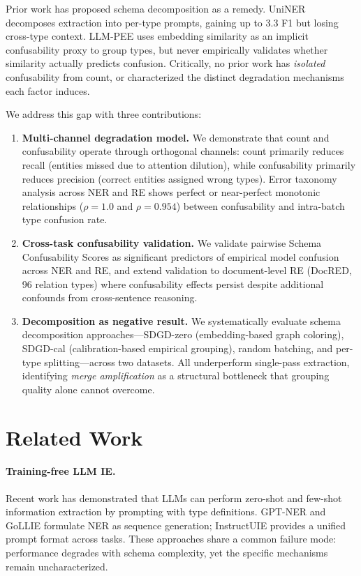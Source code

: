 \documentclass[11pt,a4paper]{article}
\begin{document}
Prior work has proposed schema decomposition as a remedy. UniNER decomposes extraction into per-type prompts, gaining up to 3.3 F1 but losing cross-type context. LLM-PEE uses embedding similarity as an implicit confusability proxy to group types, but never empirically validates whether similarity actually predicts confusion. Critically, no prior work has \emph{isolated} confusability from count, or characterized the distinct degradation mechanisms each factor induces.

We address this gap with three contributions:

\begin{enumerate}
\item \textbf{Multi-channel degradation model.} We demonstrate that count and confusability operate through orthogonal channels: count primarily reduces recall (entities missed due to attention dilution), while confusability primarily reduces precision (correct entities assigned wrong types). Error taxonomy analysis across NER and RE shows perfect or near-perfect monotonic relationships ($\rho{=}1.0$ and $\rho{=}0.954$) between confusability and intra-batch type confusion rate.

\item \textbf{Cross-task confusability validation.} We validate pairwise Schema Confusability Scores as significant predictors of empirical model confusion across NER and RE, and extend validation to document-level RE (DocRED, 96 relation types) where confusability effects persist despite additional confounds from cross-sentence reasoning.

\item \textbf{Decomposition as negative result.} We systematically evaluate schema decomposition approaches---SDGD-zero (embedding-based graph coloring), SDGD-cal (calibration-based empirical grouping), random batching, and per-type splitting---across two datasets. All underperform single-pass extraction, identifying \emph{merge amplification} as a structural bottleneck that grouping quality alone cannot overcome.
\end{enumerate}

\section{Related Work}

\paragraph{Training-free LLM IE.}
Recent work has demonstrated that LLMs can perform zero-shot and few-shot information extraction by prompting with type definitions.
GPT-NER and GoLLIE formulate NER as sequence generation; InstructUIE provides a unified prompt format across tasks.
These approaches share a common failure mode: performance degrades with schema complexity, yet the specific mechanisms remain uncharacterized.
\end{document}
